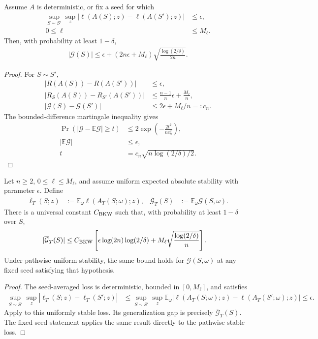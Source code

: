 \begin{theorem}
Assume $A$ is deterministic, or fix a seed for which
\begin{align}
 \sup_{S\sim S'}\sup_z|\ell(A(S);z)-\ell(A(S');z)|&\le\epsilon,\\
 0\le\ell&\le M_\ell.
\end{align}
Then, with probability at least $1-\delta$,
\begin{align}
 |\mathcal G(S)|
 \le\epsilon+(2n\epsilon+M_\ell)
 \sqrt{\frac{\log(2/\delta)}{2n}}.
\end{align}
\end{theorem}
\begin{proof}
For $S\sim S'$,
\begin{align}
 |R(A(S))-R(A(S'))|&\le\epsilon,\\
 |R_S(A(S))-R_{S'}(A(S'))|
 &\le\frac{n-1}{n}\epsilon+\frac{M_\ell}{n},\\
 |\mathcal G(S)-\mathcal G(S')|&\le2\epsilon+M_\ell/n=:c_n.
\end{align}
The bounded-difference martingale inequality gives
\begin{align}
 \Pr(|\mathcal G-\mathbb E\mathcal G|\ge t)
 &\le2\exp\left(-\frac{2t^2}{nc_n^2}\right),\\
 |\mathbb E\mathcal G|&\le\epsilon,\\
 t&=c_n\sqrt{n\log(2/\delta)/2}.
\end{align}
\end{proof}

\begin{theorem}
\label{thm:sharp-stability-concentration}
Let $n\ge2$, $0\le\ell\le M_\ell$, and assume uniform expected absolute stability with parameter $\epsilon$. Define
\begin{align}
 \bar\ell_T(S;z)&:=\mathbb E_\omega\ell(A_T(S;\omega);z),&
 \overline{\mathcal G}_T(S)&:=\mathbb E_\omega\mathcal G(S,\omega).
\end{align}
There is a universal constant $C_{\rm BKW}$ such that, with probability at least $1-\delta$ over $S$,
\begin{align}\label{eq:sharp-stability-concentration}
 |\overline{\mathcal G}_T(S)|
 &\le C_{\rm BKW}\left[
 \epsilon\log(2n)\log(2/\delta)
 +M_\ell\sqrt{\frac{\log(2/\delta)}n}\right].
\end{align}
Under pathwise uniform stability, the same bound holds for $\mathcal G(S,\omega)$ at any fixed seed satisfying that hypothesis.
\end{theorem}
\begin{proof}
The seed-averaged loss is deterministic, bounded in $[0,M_\ell]$, and satisfies
\begin{align}
 \sup_{S\sim S'}\sup_z
 |\bar\ell_T(S;z)-\bar\ell_T(S';z)|
 &\le\sup_{S\sim S'}\sup_z\mathbb E_\omega
 |\ell(A_T(S;\omega);z)-\ell(A_T(S';\omega);z)|\le\epsilon.
\end{align}
Apply \citet[Corollary~8]{bousquet2020sharper} to this uniformly stable loss. Its generalization gap is precisely $\overline{\mathcal G}_T(S)$. The fixed-seed statement applies the same result directly to the pathwise stable loss.
\end{proof}

